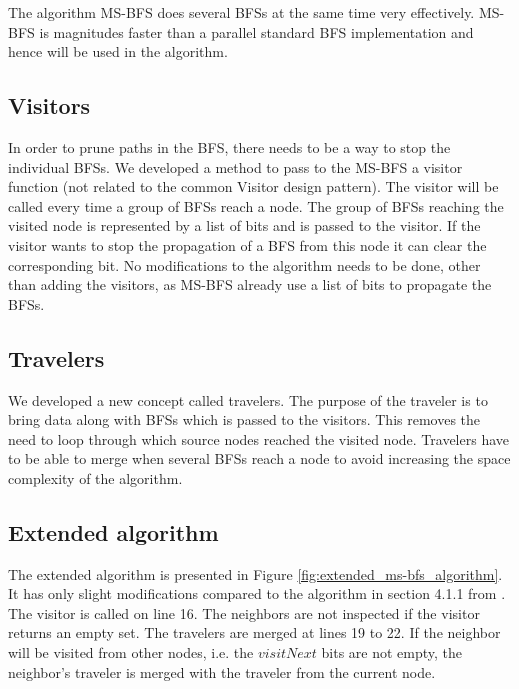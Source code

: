 The algorithm MS-BFS \cite{msbfs} does several BFSs at the same time very effectively. MS-BFS is magnitudes faster than a parallel standard BFS implementation and hence will be used in the algorithm. 

\subsection{Visitors}
In order to prune paths in the BFS, there needs to be a way to stop the individual BFSs. We developed a method to pass to the MS-BFS a visitor function (not related to the common Visitor design pattern). The visitor will be called every time a group of BFSs reach a node. The group of BFSs reaching the visited node is represented by a list of bits and is passed to the visitor. If the visitor wants to stop the propagation of a BFS from this node it can clear the corresponding bit. No modifications to the algorithm needs to be done, other than adding the visitors, as MS-BFS already use a list of bits to propagate the BFSs.

\subsection{Travelers}
We developed a new concept called travelers. The purpose of the traveler is to bring data along with BFSs which is passed to the visitors. This removes the need to loop through which source nodes reached the visited node. Travelers have to be able to merge when several BFSs reach a node to avoid increasing the space complexity of the algorithm. 

\subsection{Extended algorithm}

The extended algorithm is presented in Figure \ref{fig:extended_ms-bfs_algorithm}. It has only slight modifications compared to the algorithm in section 4.1.1 from \cite{msbfs}. The visitor is called on line 16. The neighbors are not inspected if the visitor returns an empty set. The travelers are merged at lines 19 to 22. If the neighbor will be visited from other nodes, i.e. the $visitNext$ bits are not empty, the neighbor's traveler is merged with the traveler from the current node.

